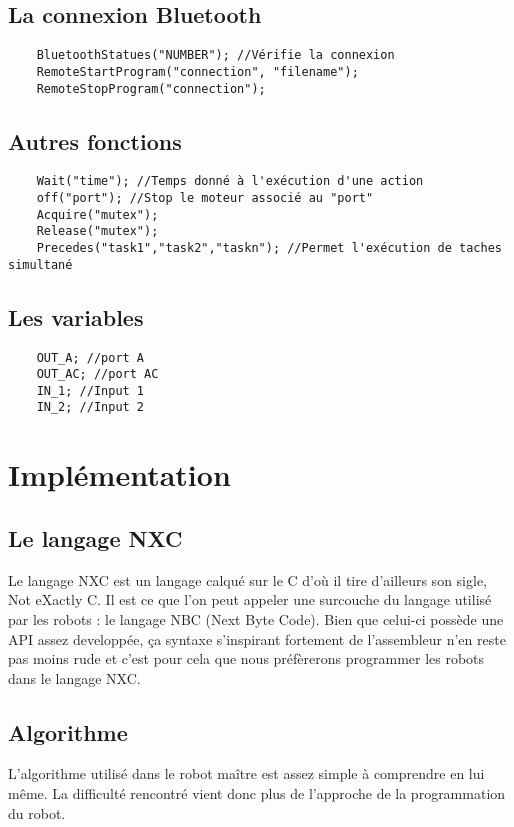 \subsection{La connexion Bluetooth }
\begin{verbatim}
	BluetoothStatues("NUMBER"); //Vérifie la connexion
	RemoteStartProgram("connection", "filename");
	RemoteStopProgram("connection");

\end{verbatim}

\subsection{Autres fonctions }
\begin{verbatim}
	Wait("time"); //Temps donné à l'exécution d'une action
	off("port"); //Stop le moteur associé au "port"
	Acquire("mutex"); 
	Release("mutex"); 
	Precedes("task1","task2","taskn"); //Permet l'exécution de taches simultané

\end{verbatim}

\subsection{Les variables }
\begin{verbatim}
	OUT_A; //port A
	OUT_AC; //port AC
	IN_1; //Input 1
	IN_2; //Input 2

\end{verbatim}

\section{Implémentation}

\subsection{Le langage NXC}

Le langage NXC est un langage calqué sur le C d'où il tire d'ailleurs son
sigle, Not eXactly C. Il est ce que l'on peut appeler une surcouche du
langage utilisé par les robots  : le langage NBC (Next Byte Code). Bien
que celui-ci possède une API assez developpée, ça syntaxe s'inspirant
fortement de l'assembleur n'en reste pas moins rude et c'est pour cela
que nous préfèrerons programmer les robots  dans le langage NXC.


\subsection{Algorithme}


L'algorithme utilisé dans le robot maître est assez simple à comprendre
en lui même. La difficulté rencontré vient donc plus de l'approche de la
programmation du robot.

